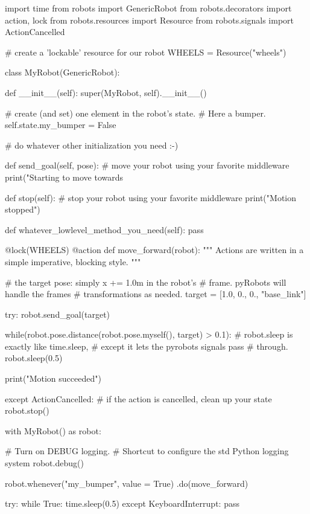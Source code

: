\documentclass[a4paper, 10pt, conference]{ieeeconf}      %
\begin{document}
\begin{pythoncode}
    import time
    from robots import GenericRobot
    from robots.decorators import action, lock
    from robots.resources import Resource
    from robots.signals import ActionCancelled

    # create a 'lockable' resource for our robot
    WHEELS = Resource("wheels")

    class MyRobot(GenericRobot):

      def __init__(self):
        super(MyRobot, self).__init__()

        # create (and set) one element in the robot's state.
        # Here a bumper.
        self.state.my_bumper = False

        # do whatever other initialization you need :-)

      def send_goal(self, pose):
        # move your robot using your favorite middleware
        print("Starting to move towards %

      def stop(self):
        # stop your robot using your favorite middleware
        print("Motion stopped")

      def whatever_lowlevel_method_you_need(self):
        pass

    @lock(WHEELS)
    @action
    def move_forward(robot):
      """ Actions are written in a simple imperative, 
          blocking style.
      """

      # the target pose: simply x += 1.0m in the robot's 
      # frame. pyRobots will handle the frames 
      # transformations as needed.
      target = [1.0, 0., 0., "base_link"]

      try:
        robot.send_goal(target)

        while(robot.pose.distance(robot.pose.myself(), 
                                  target) > 0.1):
            # robot.sleep is exactly like time.sleep, 
            # except it lets the pyrobots signals pass 
            # through.
            robot.sleep(0.5)

        print("Motion succeeded")

      except ActionCancelled:
        # if the action is cancelled, clean up your state
        robot.stop()


    with MyRobot() as robot:

      # Turn on DEBUG logging.
      # Shortcut to configure the std Python logging system
      robot.debug()

      robot.whenever("my_bumper", value = True)
                                    .do(move_forward)

      try:
        while True:
          time.sleep(0.5)
      except KeyboardInterrupt:
        pass
\end{pythoncode}
\end{document}
